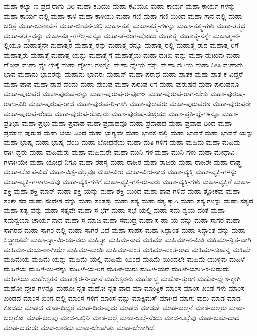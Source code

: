 {ಮಹಾ-ಕಲ್ಯಾ-ಣ-ಪ್ರದ-ರಾಗು-ವಿರಿ
ಮಹಾ-ಕವಿಯು
ಮಹಾ-ಕವಿಯೂ
ಮಹಾ-ಕಾರ್ಯ
ಮಹಾ-ಕಾರ್ಯ-ಗಳನ್ನು
ಮಹಾ-ಕಾರ್ಯ-ದಲ್ಲಿ
ಮಹಾ-ಕಾಳಿ
ಮಹಾ-ಕಾಳಿಯು
ಮಹಾ-ಗಣಿ
ಮಹಾ-ಗಣಿ-ಯಿಂದ
ಮಹಾ-ಗಾನ-ದಲ್ಲಿ
ಮಹಾ-ಚರಿತ್ರೆ
ಮಹಾ-ಚುನಾವಣೆ
ಮಹಾ-ಜೀವನ-ದಲ್ಲಿ
ಮಹಾ-ತತ್ತ್ವ
ಮಹಾ-ತತ್ತ್ವ-ಗಳನ್ನು
ಮಹಾ-ತತ್ತ್ವ-ಗಳು
ಮಹಾ-ತತ್ತ್ವದ
ಮಹಾ-ತತ್ತ್ವ-ವನ್ನು
ಮಹಾ-ತತ್ತ್ವ-ಗಳೆಲ್ಲ-ವನ್ನೂ
ಮಹಾ-ತ-ರಂಗ-ವೊಂದು
ಮಹಾತ್ಮ
ಮಹಾತ್ಮ-ನನ್ನೇ
ಮಹಾತ್ಮ-ನ-ಲ್ಲಿಯೂ
ಮಹಾತ್ಮನೇ
ಮಹಾತ್ಮರ
ಮಹಾತ್ಮ-ರನ್ನು
ಮಹಾತ್ಮ-ರನ್ನೂ
ಮಹಾತ್ಮ-ರಲ್ಲಿ
ಮಹಾತ್ಮ-ರಾದ
ಮಹಾತ್ಮ-ರಿಗೆ
ಮಹಾತ್ಮರು
ಮಹಾತ್ಮೆ
ಮಹಾತ್ಮೆ-ಯನ್ನು
ಮಹಾತ್ಮ್ಯೆಗೆ
ಮಹಾತ್ಮ್ಯೆಯ
ಮಹಾ-ದುಃಖ-ವನ್ನು
ಮಹಾ-ದುಃಖವು
ಮಹಾ-ದೋಷ
ಮಹಾ-ಧ್ಯೇ-ಯಕ್ಕೆ
ಮಹಾ-ಧ್ಯೇಯ-ಗಳನ್ನೂ
ಮಹಾ-ಧ್ಯೇಯ-ವನ್ನು
ಮಹಾ-ನದಿಯ
ಮಹಾ-ನೀತಿ
ಮಹಾನು-ಭಾವ
ಮಹಾನು-ಭಾವರನ್ನು
ಮಹಾನು-ಭಾವರು
ಮಹಾನ್
ಮಹಾ-ಪರಾಧ
ಮಹಾ-ಪಾತಕ
ಮಹಾ-ಪಾತ-ಕ-ವಿದ್ದರೆ
ಮಹಾ-ಪಾಪ
ಮಹಾ-ಪಾಪ-ವೆಂದು
ಮಹಾ-ಪುರುಷ
ಮಹಾ-ಪುರುಷ-ರಿಗೆ
ಮಹಾ-ಪುರುಷನ
ಮಹಾ-ಪುರುಷನೂ
ಮಹಾ-ಪುರುಷರ
ಮಹಾ-ಪುರುಷ-ರನ್ನು
ಮಹಾ-ಪುರುಷ-ರ-ಪೂರ್ಣ
ಮಹಾ-ಪುರುಷ-ರಾಗ-ಬೇಕು
ಮಹಾ-ಪುರುಷ-ರಾಗು-ವಿರಿ
ಮಹಾ-ಪುರುಷ-ರಾದ
ಮಹಾ-ಪುರುಷ-ರಿ-ಗಾಗಿ
ಮಹಾ-ಪುರುಷರು
ಮಹಾ-ಪುರುಷರೂ
ಮಹಾ-ಪುರುಷರೇ
ಮಹಾ-ಪುರುಷ-ರೆಂದು
ಮಹಾ-ಪುರುಷ-ರೊಬ್ಬರು
ಮಹಾ-ಪುರುಷ-ಸಂಶ್ರಯಃ
ಮಹಾ-ಪ್ರತಿ-ಜ್ಞೆ-ಗಳನ್ನೂ
ಮಹಾ-ಪ್ರತಿಭಾ
ಮಹಾ-ಪ್ರಭು
ಮಹಾ-ಪ್ರವಾಹ
ಮಹಾ-ಪ್ರವಾಹವೂ
ಮಹಾ-ಪ್ರವಾಹದ
ಮಹಾ-ಪ್ರವಾಹ-ದಿಂದ
ಮಹಾ-ಪ್ರಮಾಣ-ಪುರುಷ
ಮಹಾ-ಭಯ-ದಿಂದ
ಮಹಾ-ಭಾಗ್ಯವೇ
ಮಹಾ-ಭಾರತ-ದಲ್ಲಿ
ಮಹಾ-ಭಾವನೆ
ಮಹಾ-ಭಾವನೆ-ಯನ್ನು
ಮಹಾ-ಭಾಷ್ಯ
ಮಹಾ-ಭಾಷ್ಯ-ವೆಂಬ
ಮಹಾ-ಬೋಧನೆಯ
ಮಹಾ-ಮತಿ-ಗಳಿಗೆ
ಮಹಾ-ಮಹಿಮ
ಮಹಾ-ಮಹಿಮ-ರಾಗಿ-ದ್ದರು
ಮಹಾ-ಮಹಿಮರು
ಮಹಾ-ಮಹಿಮರೇ
ಮಹಾ-ಮುನಿ-ಗಳ
ಮಹಾ-ಮುನಿ-ಗಳು
ಮಹಾ-ಮೇಧಾವಿ-ಗಳಾಗಿಯೇ
ಮಹಾ-ಯೋಧ-ನಿಗೂ
ಮಹಾ-ರಹಸ್ಯ
ಮಹಾ-ರಾಜರ
ಮಹಾ-ರಾಜರು
ಮಹಾ-ರಾಜರೇ
ಮಹಾ-ರಾಷ್ಟ್ರ
ಮಹಾ-ಲೋಪ-ವಿದೆ
ಮಹಾ-ವಿಶ್ವ-ವೆಲ್ಲವೂ
ಮಹಾ-ವೀರ
ಮಹಾ-ವೀರ-ನಾದ
ಮಹಾ-ವ್ಯಕ್ತಿ
ಮಹಾ-ವ್ಯಕ್ತಿ-ಗಳನ್ನು
ಮಹಾ-ವ್ಯಕ್ತಿ-ಗಳಾಗು-ವೆವು
ಮಹಾ-ವ್ಯಕ್ತಿ-ಗಳಿಗೆ
ಮಹಾ-ವ್ಯಕ್ತಿ-ಗಳಿ-ರು-ವರು
ಮಹಾ-ವ್ಯಕ್ತಿ-ಗಳು
ಮಹಾ-ವ್ಯಕ್ತಿಗೆ
ಮಹಾ-ಶಕ್ತಿ
ಮಹಾ-ಶಕ್ತಿ-ಮಾನ್
ಮಹಾ-ಶಕ್ತಿ-ಯನ್ನು
ಮಹಾ-ಶಕ್ತಿ-ಯಿಂದ
ಮಹಾ-ಶಾಪ-ಗಳಿವೆ
ಮಹಾ-ಶ್ಲೋಕವು
ಮಹಾ-ಸಂಕೇ-ತದ
ಮಹಾ-ಸಂದೇಶ-ವನ್ನು
ಮಹಾ-ಸಂಪತ್ತು
ಮಹಾ-ಸತ್ಯ
ಮಹಾ-ಸತ್ಯ-ಕ್ಕಾಗಿ
ಮಹಾ-ಸತ್ಯ-ಗಳನ್ನು
ಮಹಾ-ಸತ್ಯದ
ಮಹಾ-ಸತ್ಯ-ವನ್ನು
ಮಹಾ-ಸತ್ಯವೇ
ಮಹಾ-ಸ-ಭೆಗೆ
ಮಹಾ-ಸಭೆ-ಯಲ್ಲಿ
ಮಹಾ-ಸಮ-ನ್ವಯ-ದಂತೆ
ಮಹಾ-ಸಮನ್ವಯಾ-ಚಾರ್ಯ-ನಾದ
ಮಹಾ-ಸ-ಮಾಜ
ಮಹಾ-ಸಮುದ್ರ
ಮಹಾ-ಸ-ಹಾ-ಯ-ವನ್ನು
ಮಹಾ-ಸಾಗರ
ಮಹಾ-ಸಾಗರದ
ಮಹಾ-ಸಾಗರ-ದಲ್ಲಿ
ಮಹಾ-ಸಾಗರ-ವಿದೆ
ಮಹಾ-ಸಾಹಸ
ಮಹಾ-ಸಿದ್ಧಾಂತ
ಮಹಾ-ಸಿದ್ಧಾಂತ-ವನ್ನು
ಮಹಾ-ಸಿದ್ಧಾಂತವೇ
ಮಹಾ-ಸ್ವಾ-ಮಿ-ಯ-ವರು
ಮಹಿತ್ವಾ
ಮಹಿಮ-ನಾದ
ಮಹಿಮಾ
ಮಹಿಮಾ-ನ-ಮಿತಿ
ಮಹಿಮಾ-ನ್ವಿತ-ವಾಗಿ
ಮಹಿಮಾ-ಮಯ-ರಾ-ಗಿಯೇ
ಮಹಿಮಾ-ಮಯಿ
ಮಹಿಮಾ-ವಂತ
ಮಹಿಮಾ-ವಂತ-ರಾದ
ಮಹಿಮಾ-ಸಂಪನ್ನ
ಮಹಿಮೆ
ಮಹಿಮೆಯ
ಮಹಿಮೆ-ಯನ್ನು
ಮಹಿಮೆ-ಯಲ್ಲಿ
ಮಹಿಮೆ-ಯಿಂದ
ಮಹಿಮೆ-ಯಿಂದಲೇ
ಮಹಿಮೆ-ಯುಳ್ಳವು
ಮಹಿಳೆ
ಮಹಿಳೆಯ
ಮಹಿಳೆ-ಯ-ರನ್ನು
ಮಹಿಳೆ-ಯ-ರಿಗೆ
ಮಹಿಳೆ-ಯರು
ಮಹಿಳೆ-ಯರೆ
ಮಹಿಳೆ-ಯಾಗಿ-ರ-ಬಹುದು
ಮಹಿಳೆಯು
ಮಹೇಶ್ವರನ
ಮಹೇಶ್ವರ-ನಿ-ದ್ದಾನೆ
ಮಹೇಶ್ವರನು
ಮಹೋಚ್ಚ
ಮಹೋ-ತ್ತುಂಗ
ಮಹೋ-ದ್ದೇಶ-ಕ್ಕಾಗಿ
ಮಹೋ-ದ್ದೇಶ-ಗಳನ್ನೂ
ಮಹೋ-ನ್ನತ
ಮಹೋ-ನ್ನತ-ವಾದ
ಮಾ
ಮಾಂತ್ರಿಕ
ಮಾಂಸ
ಮಾಂಸ-ಖಂಡ-ಗಳು
ಮಾಂಸ-ಖಂಡದ
ಮಾಂಸ-ಖಂಡ-ದಲ್ಲಿ
ಮಾಂಸ-ಗಳಿಗೆ
ಮಾಂಸ-ವನ್ನು
ಮಾಕ್ಸಿಮಸ್
ಮಾಗಿದ
ಮಾಗು-ವುದು
ಮಾಡ
ಮಾಡ-ಕೂಡದು
ಮಾಡದ
ಮಾಡ-ದಿದ್ದರೆ
ಮಾಡ-ದಿರು-ವುದು
ಮಾಡದೆ
ಮಾಡದೇ
ಮಾಡ-ಬಲ್ಲನೆ
ಮಾಡ-ಬಲ್ಲರು
ಮಾಡ-ಬಲ್ಲರೋ
ಮಾಡ-ಬಲ್ಲವು
ಮಾಡ-ಬಲ್ಲಿರಿ
ಮಾಡ-ಬಲ್ಲೆ
ಮಾಡ-ಬಲ್ಲೆ-ನೆಂದು
ಮಾಡ-ಬಲ್ಲೆವು
ಮಾಡ-ಬಹು-ದಾದ
ಮಾಡ-ಬಹುದು
ಮಾಡ-ಬಾರದು
ಮಾಡ-ಬೇಕಾಗಿತ್ತು
ಮಾಡ-ಬೇಕಾಗಿದೆ
}
